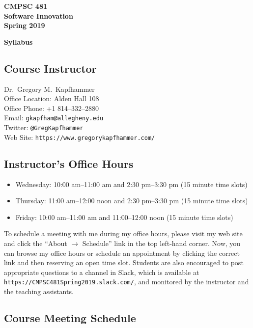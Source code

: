 \documentclass[11pt]{article}
\newcommand{\url}[1]{\lstinline{#1}}
\newcommand{\syllabustitle}[1]
{
  \begin{center}
    \begin{center}
      \bf
      CMPSC 481\\Software Innovation\\
      Spring 2019\\
      \medskip
    \end{center}
    \bf
    #1
  \end{center}
}
\begin{document}
\thispagestyle{empty}

\syllabustitle{Syllabus}

\vspace*{-1em}
\subsection*{Course Instructor}
Dr.\ Gregory M.\ Kapfhammer\\
\noindent Office Location: Alden Hall 108 \\
\noindent Office Phone: +1 814--332--2880 \\
\noindent Email: \url{gkapfham@allegheny.edu} \\
\noindent Twitter: \url{@GregKapfhammer} \\
\noindent Web Site: \url{https://www.gregorykapfhammer.com/}

\subsection*{Instructor's Office Hours}

\begin{itemize}

  \itemsep0em

  \item Wednesday: 10:00 am--11:00 am and 2:30 pm--3:30 pm (15 minute time slots)

  \item Thursday: 11:00 am--12:00 noon and 2:30 pm--3:30 pm (15 minute time slots)

  \item Friday: 10:00 am--11:00 am and 11:00--12:00 noon (15 minute time slots)

\end{itemize}

\noindent To schedule a meeting with me during my office hours, please visit my
web site and click the ``About $\rightarrow$ Schedule'' link in the top
left-hand corner. Now, you can browse my office hours or schedule an appointment
by clicking the correct link and then reserving an open time slot. Students are
also encouraged to post appropriate questions to a channel in Slack, which is
available at \url{https://CMPSC481Spring2019.slack.com/}, and monitored by the
instructor and the teaching assistants.

\subsection*{Course Meeting Schedule}
\end{document}
